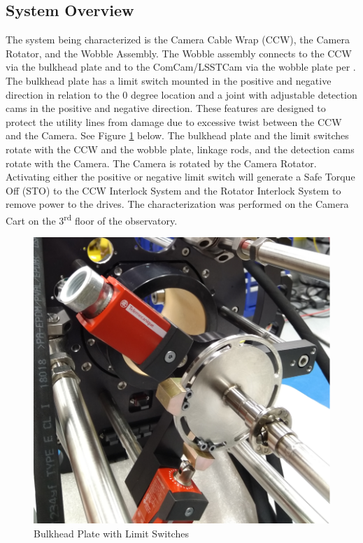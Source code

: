 \documentclass[SE,authoryear,toc]{lsstdoc}
\begin{document}
\subsection{System Overview}
The system being characterized is the Camera Cable Wrap (CCW), the Camera Rotator, and the Wobble Assembly. The Wobble assembly connects to the CCW via the bulkhead plate and to the ComCam/LSSTCam via the wobble plate per . The bulkhead plate has a limit switch mounted in the positive and negative direction in relation to the 0 degree location and a joint with adjustable detection cams in the positive and negative direction. These features are designed to protect the utility lines from damage due to excessive twist between the CCW and the Camera. See Figure \ref{fig:Figure_1} below. The bulkhead plate and the limit switches rotate with the CCW and the wobble plate, linkage rods, and the detection cams rotate with the Camera. The Camera is rotated by the Camera Rotator. Activating either the positive or negative limit switch will generate a Safe Torque Off (STO) to the CCW Interlock System and the Rotator Interlock System to remove power to the drives. The characterization was performed on the Camera Cart on the 3\textsuperscript{rd} floor of the observatory.

\begin{figure}[h!]
  \includegraphics[width=\linewidth]{media/Figure_1.png}
  \caption{Bulkhead Plate with Limit Switches}
  \label{fig:Figure_1}
\end{figure}
\end{document}
